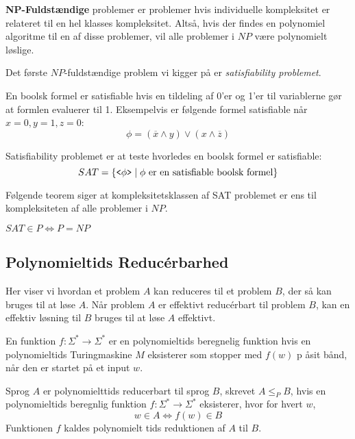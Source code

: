 \textbf{NP-Fuldstændige} problemer er problemer hvis individuelle kompleksitet er relateret til en hel klasses kompleksitet. Altså, hvis der findes en polynomiel algoritme til en af disse problemer, vil alle problemer i $NP$ være polynomielt løslige.

Det første $NP$-fuldstændige problem vi kigger på er \textit{satisfiability problemet}.

En boolsk formel er satisfiable hvis en tildeling af 0'er og 1'er til variablerne gør at formlen evaluerer til 1. Eksempelvis er følgende formel satisfiable når $x = 0, y = 1, z = 0$:
\begin{equation*}
\phi = (\overline{x} \land y) \lor (x \land \overline{z})
\end{equation*}

Satisfiability problemet er at teste hvorledes en boolsk formel er satisfiable:
\begin{equation*}
SAT = \{\text{\texttt{<$\phi$>}} \mid \phi \text{ er en satisfiable boolsk formel}\}
\end{equation*}

Følgende teorem siger at kompleksitetsklassen af SAT problemet er ens til kompleksiteten af alle problemer i $NP$.

\begin{theorem}
$SAT \in P \iff P = NP$
\end{theorem}

\subsection{Polynomieltids Reducérbarhed}%
\label{subsec:polynomialreducibility}

Her viser vi hvordan et problem $A$ kan reduceres til et problem $B$, der så kan bruges til at løse $A$. Når problem $A$ er effektivt reducérbart til problem $B$, kan en effektiv løsning til $B$ bruges til at løse $A$ effektivt.

\begin{definition}
En funktion $f : \Sigma^{*} \longrightarrow \Sigma^{*}$ er en polynomieltids beregnelig funktion hvis en polynomieltids Turingmaskine $M$ eksisterer som stopper med $f(w)$ p åsit bånd, når den er startet på et input $w$.
\end{definition}

\begin{definition}
  Sprog $A$ er polynomielttids reducerbart til sprog $B$, skrevet $A \leq_{P} B$, hvis en polynomieltids beregnlig funktion $f : \Sigma^{*} \longrightarrow \Sigma^{*}$ eksisterer, hvor for hvert $w$,
  \begin{equation*}
w \in A \iff f(w) \in B
\end{equation*}
Funktionen $f$ kaldes polynomielt tids reduktionen af $A$ til $B$.
\end{definition}

